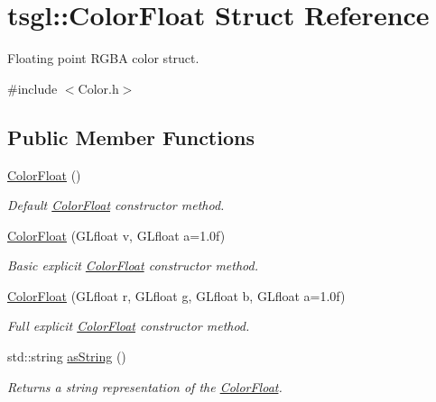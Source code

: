 \hypertarget{structtsgl_1_1_color_float}{}\section{tsgl\+:\+:Color\+Float Struct Reference}
\label{structtsgl_1_1_color_float}


Floating point R\+G\+BA color struct.  




{\ttfamily \#include $<$Color.\+h$>$}

\subsection*{Public Member Functions}
\begin{DoxyCompactItemize}
\item 
\hyperlink{structtsgl_1_1_color_float_a22e82c71a0feedbb7b3e3a7a73b80e30}{Color\+Float} ()
\begin{DoxyCompactList}\small\item\em Default \hyperlink{structtsgl_1_1_color_float}{Color\+Float} constructor method. \end{DoxyCompactList}\item 
\hyperlink{structtsgl_1_1_color_float_a6984b10702d3c29324f63e3dee907687}{Color\+Float} (G\+Lfloat v, G\+Lfloat a=1.\+0f)
\begin{DoxyCompactList}\small\item\em Basic explicit \hyperlink{structtsgl_1_1_color_float}{Color\+Float} constructor method. \end{DoxyCompactList}\item 
\hyperlink{structtsgl_1_1_color_float_af52e422d50038bc2b516abb3826f2e17}{Color\+Float} (G\+Lfloat r, G\+Lfloat g, G\+Lfloat b, G\+Lfloat a=1.\+0f)
\begin{DoxyCompactList}\small\item\em Full explicit \hyperlink{structtsgl_1_1_color_float}{Color\+Float} constructor method. \end{DoxyCompactList}\item 
std\+::string \hyperlink{structtsgl_1_1_color_float_a1048e8773d65fa1554bc8782e76527ed}{as\+String} ()
\begin{DoxyCompactList}\small\item\em Returns a string representation of the \hyperlink{structtsgl_1_1_color_float}{Color\+Float}. \end{DoxyCompactList}\item 

\end{DoxyCompactItemize}
